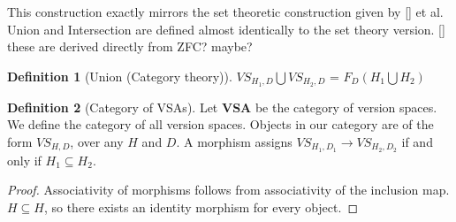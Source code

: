 \documentclass{article}
\theoremstyle{definition}
\newtheorem{definition}{Definition}[section]
\begin{document}
This construction exactly mirrors the set theoretic construction given by [] et al. Union and Intersection are defined almost identically to the set theory version. [] these are derived directly from ZFC? maybe? 

\begin{definition}[Union (Category theory)]
$VS_{H_1, D} \bigcup VS_{H_2, D}$ = $F_D (H_1 \bigcup H_2)$
\end{definition}


\begin{definition}[Category of VSAs]
Let \textbf{VSA} be the category of version spaces. We define the category of all version spaces. Objects in our category are of the form $VS_{H,D}$, over any $H$ and $D$. A morphism assigns $VS_{H_1, D_1} \rightarrow VS_{H_2, D_2}$ if and only if $H_1 \subseteq H_2$.
\end{definition}

\begin{proof}
Associativity of morphisms follows from associativity of the inclusion map. $H \subseteq H$, so there exists an identity morphism for every object. 
\end{proof}
\end{document}
